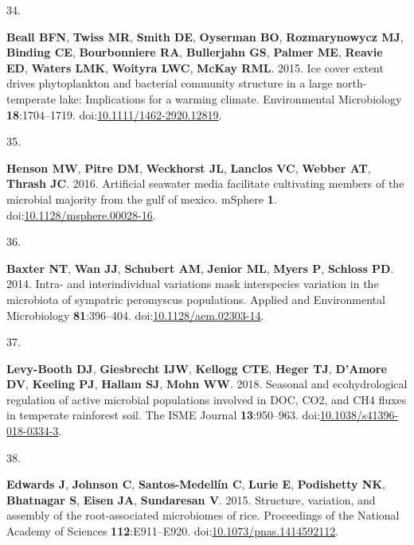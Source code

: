 \documentclass[
]{article}
\newlength{\cslhangindent}
\newlength{\csllabelwidth}
\newlength{\cslentryspacingunit} %
\newenvironment{CSLReferences}[2] %
 {%
  \setlength{\parindent}{0pt}
  \ifodd #1
  \let\oldpar\par
  \def\par{\hangindent=\cslhangindent\oldpar}
  \fi
  \setlength{\parskip}{#2\cslentryspacingunit}
 }%
 {}
\newcommand{\CSLLeftMargin}[1]{\parbox[t]{\csllabelwidth}{#1}}
\newcommand{\CSLRightInline}[1]{\parbox[t]{\linewidth - \csllabelwidth}{#1}\break}
\begin{document}
\begin{CSLReferences}{0}{1}
\leavevmode{}%
\CSLLeftMargin{34. }%
\CSLRightInline{\textbf{Beall BFN}, \textbf{Twiss MR}, \textbf{Smith
DE}, \textbf{Oyserman BO}, \textbf{Rozmarynowycz MJ}, \textbf{Binding
CE}, \textbf{Bourbonniere RA}, \textbf{Bullerjahn GS}, \textbf{Palmer
ME}, \textbf{Reavie ED}, \textbf{Waters LMK}, \textbf{Woityra LWC},
\textbf{McKay RML}. 2015. Ice cover extent drives phytoplankton and
bacterial community structure in a large north-temperate lake:
Implications for a warming climate. Environmental Microbiology
\textbf{18}:1704--1719.
doi:\href{https://doi.org/10.1111/1462-2920.12819}{10.1111/1462-2920.12819}.}

\leavevmode{}%
\CSLLeftMargin{35. }%
\CSLRightInline{\textbf{Henson MW}, \textbf{Pitre DM}, \textbf{Weckhorst
JL}, \textbf{Lanclos VC}, \textbf{Webber AT}, \textbf{Thrash JC}. 2016.
Artificial seawater media facilitate cultivating members of the
microbial majority from the gulf of mexico. {mSphere} \textbf{1}.
doi:\href{https://doi.org/10.1128/msphere.00028-16}{10.1128/msphere.00028-16}.}

\leavevmode{}%
\CSLLeftMargin{36. }%
\CSLRightInline{\textbf{Baxter NT}, \textbf{Wan JJ}, \textbf{Schubert
AM}, \textbf{Jenior ML}, \textbf{Myers P}, \textbf{Schloss PD}. 2014.
Intra- and interindividual variations mask interspecies variation in the
microbiota of sympatric peromyscus populations. Applied and
Environmental Microbiology \textbf{81}:396--404.
doi:\href{https://doi.org/10.1128/aem.02303-14}{10.1128/aem.02303-14}.}

\leavevmode{}%
\CSLLeftMargin{37. }%
\CSLRightInline{\textbf{Levy-Booth DJ}, \textbf{Giesbrecht IJW},
\textbf{Kellogg CTE}, \textbf{Heger TJ}, \textbf{D'Amore DV},
\textbf{Keeling PJ}, \textbf{Hallam SJ}, \textbf{Mohn WW}. 2018.
Seasonal and ecohydrological regulation of active microbial populations
involved in {DOC}, {CO}2, and {CH}4 fluxes in temperate rainforest soil.
The {ISME} Journal \textbf{13}:950--963.
doi:\href{https://doi.org/10.1038/s41396-018-0334-3}{10.1038/s41396-018-0334-3}.}

\leavevmode{}%
\CSLLeftMargin{38. }%
\CSLRightInline{\textbf{Edwards J}, \textbf{Johnson C},
\textbf{Santos-Medellín C}, \textbf{Lurie E}, \textbf{Podishetty NK},
\textbf{Bhatnagar S}, \textbf{Eisen JA}, \textbf{Sundaresan V}. 2015.
Structure, variation, and assembly of the root-associated microbiomes of
rice. Proceedings of the National Academy of Sciences
\textbf{112}:E911--E920.
doi:\href{https://doi.org/10.1073/pnas.1414592112}{10.1073/pnas.1414592112}.}


\end{CSLReferences}
\end{document}
